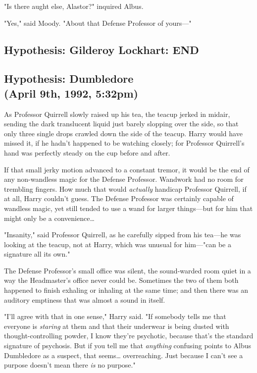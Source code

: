 "Is there aught else, Alastor?" inquired Albus.

"Yes," said Moody. "About that Defense Professor of yours---"
\sbreak
\vspace{-2\baselineskip}
\subsection{Hypothesis: Gilderoy Lockhart: END}
\sbreak
\vspace{-2\baselineskip}
\subsection{Hypothesis: Dumbledore\\
(April 9th, 1992, 5:32pm)}

As Professor Quirrell slowly raised up his tea, the teacup jerked in midair, 
sending the dark translucent liquid just barely slopping over the side, so that 
only three single drops crawled down the side of the teacup. Harry would have 
missed it, if he hadn't happened to be watching closely; for Professor 
Quirrell's hand was perfectly steady on the cup before and after.

If that small jerky motion advanced to a constant tremor, it would be the end 
of any non-wandless magic for the Defense Professor. Wandwork had no room for 
trembling fingers. How much that would \emph{actually} handicap Professor 
Quirrell, if at all, Harry couldn't guess. The Defense Professor was certainly 
capable of wandless magic, yet still tended to use a wand for larger 
things---but for him that might only be a convenience{\ldots}

"Insanity," said Professor Quirrell, as he carefully sipped from his tea---he 
was looking at the teacup, not at Harry, which was unusual for him---"can be a 
signature all its own."

The Defense Professor's small office was silent, the sound-warded room quiet in 
a way the Headmaster's office never could be. Sometimes the two of them both 
happened to finish exhaling or inhaling at the same time; and then there was an 
auditory emptiness that was almost a sound in itself.

"I'll agree with that in one sense," Harry said. "If somebody tells me that 
everyone is \emph{staring} at them and that their underwear is being dusted 
with thought-controlling powder, I know they're psychotic, because that's the 
standard signature of psychosis. But if you tell me that \emph{anything} 
confusing points to Albus Dumbledore as a suspect, that seems{\ldots} 
overreaching. Just because I can't see a purpose doesn't mean there \emph{is} 
no purpose."


